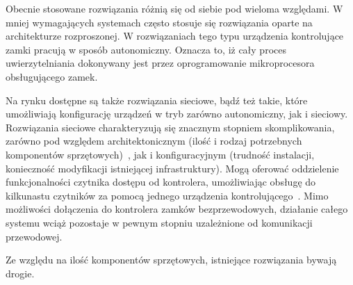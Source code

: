 		Obecnie stosowane rozwiązania różnią się od siebie pod wieloma względami. W mniej wymagających systemach często stosuje się rozwiązania oparte na architekturze rozproszonej. W rozwiązaniach tego typu urządzenia kontrolujące zamki pracują w sposób autonomiczny. Oznacza to, iż cały proces uwierzytelniania dokonywany jest przez oprogramowanie mikroprocesora obsługującego zamek.

		Na rynku dostępne są także rozwiązania sieciowe, bądź też takie, które umożliwiają konfigurację urządzeń w tryb zarówno autonomiczny, jak i sieciowy. Rozwiązania sieciowe charakteryzują się znacznym stopniem skomplikowania, zarówno pod względem architektonicznym (ilość i rodzaj potrzebnych komponentów sprzętowych)~\cite{racs5}, jak i konfiguracyjnym (trudność instalacji, konieczność modyfikacji istniejącej infrastruktury). Mogą oferować oddzielenie funkcjonalności czytnika dostępu od kontrolera, umożliwiając obsługę do kilkunastu czytników za pomocą jednego urządzenia kontrolującego~\cite{racs5}. Mimo możliwości dołączenia do kontrolera zamków bezprzewodowych, działanie całego systemu wciąż pozostaje w pewnym stopniu uzależnione od komunikacji przewodowej.

		Ze względu na ilość komponentów sprzętowych, istniejące rozwiązania bywają drogie.